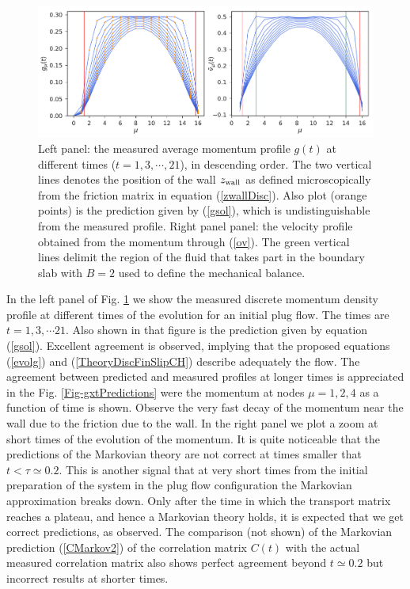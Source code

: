 \documentclass[b5paper,openright,10pt]{book}
\begin{document}
\begin{figure}[!h]
\includegraphics[width=\linewidth]{gxtPredictions_and_vtCorrected-17nodes-WALLS}
\caption[The momentum profile at different times and the velocity profile obtained from the momentum for a confined fluid - Thick bins]{Left panel: the measured average  momentum profile $g(t)$ at  different times
  ($t=1,3,\cdots,21$), in  descending order.   The two  vertical lines
  denotes  the  position  of  the   wall  $z_{\rm  wall}$  as  defined
  microscopically from the friction  matrix in equation  (\ref{zwallDisc}).
  Also  plot  (orange points) is  the  prediction  given  by  (\ref{gsol}),  which  is
  undistinguishable  from the  measured  profile.   Right panel panel: the velocity profile obtained from the momentum through (\ref{ov}). The green vertical lines delimit the region of the fluid that takes part in the boundary slab with $B=2$ used to define the mechanical balance.}
\label{Fig-gxt-vt}
\end{figure}

In  the left  panel  of  Fig.  \ref{Fig-gxt-vt}  we  show the  measured
discrete momentum density profile at  different times of the evolution
for an initial plug flow. The times are $t=1,3,\cdots 21$.  Also shown
in that figure is the prediction given by equation  (\ref{gsol}). Excellent
agreement   is  observed,   implying  that   the  proposed   equations
(\ref{evolg}) and (\ref{TheoryDiscFinSlipCH})  describe adequately the flow.
The agreement between predicted and  measured profiles at longer times
is   appreciated   in  the Fig.
\ref{Fig-gxtPredictions}   were  the   momentum   at   nodes  $\mu=1,2,4$  as a function of time is
shown. Observe the  very fast decay of the momentum  near the wall due
to the friction due to the wall. In the right panel we plot a zoom at
short times of the evolution of  the momentum.  It is quite noticeable
that the predictions of the Markovian  theory are not correct at times
smaller that $t<\tau\simeq 0.2$.  This  is another signal that at very
short times  from the initial  preparation of  the system in  the plug
flow configuration the Markovian approximation breaks down. Only after
the time in which the transport  matrix reaches a plateau, and hence a
Markovian  theory   holds,  it  is   expected  that  we   get  correct
predictions, as observed.  The comparison (not shown) of the Markovian
prediction (\ref{CMarkov2}) of the  correlation matrix $C(t)$ with the
actual measured correlation matrix also shows perfect agreement beyond
$t\simeq 0.2$ but incorrect results at shorter times.
\end{document}
